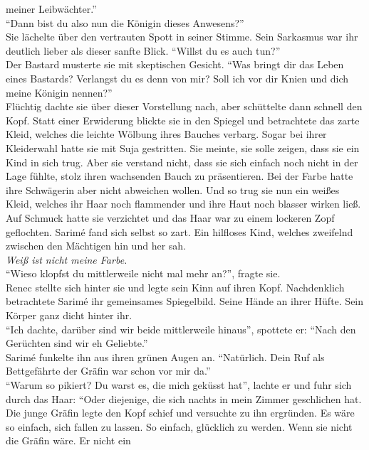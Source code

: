 meiner Leibwächter.''\\
``Dann bist du also nun die Königin dieses Anwesens?''\\
Sie lächelte über den vertrauten Spott in seiner Stimme. Sein Sarkasmus war ihr deutlich lieber als 
dieser sanfte Blick. ``Willst du es auch tun?''\\
Der Bastard musterte sie mit skeptischen Gesicht. ``Was bringt dir das Leben eines Bastards? 
Verlangst du es denn von mir? Soll ich vor dir Knien und dich meine Königin nennen?''\\
Flüchtig dachte sie über dieser Vorstellung nach, aber schüttelte dann schnell den Kopf.
Statt einer Erwiderung blickte sie in den Spiegel und betrachtete das zarte Kleid, welches die 
leichte Wölbung ihres Bauches verbarg. Sogar bei ihrer Kleiderwahl hatte sie mit Suja gestritten. 
Sie meinte, sie solle zeigen, dass sie ein Kind in sich trug. Aber sie verstand nicht, dass sie 
sich einfach noch nicht in der Lage fühlte, stolz ihren wachsenden Bauch zu präsentieren. Bei der 
Farbe hatte ihre Schwägerin aber nicht abweichen wollen. Und so trug sie nun ein weißes Kleid, 
welches ihr Haar noch flammender und ihre Haut noch blasser wirken ließ. Auf Schmuck hatte sie 
verzichtet und das Haar war zu einem lockeren Zopf geflochten. Sarimé fand sich selbst so zart. Ein 
hilfloses Kind, welches zweifelnd zwischen den Mächtigen hin und her sah.\\
\textit{Weiß ist nicht meine Farbe.}\\
``Wieso klopfst du mittlerweile nicht mal mehr an?'', fragte sie.\\
Renec stellte sich hinter sie und legte sein Kinn auf ihren Kopf. Nachdenklich betrachtete 
Sarimé ihr gemeinsames Spiegelbild. Seine Hände an ihrer Hüfte. Sein Körper ganz dicht hinter 
ihr.\\
``Ich dachte, darüber sind wir beide mittlerweile hinaus'', spottete er: ``Nach den Gerüchten sind 
wir eh Geliebte.''\\
Sarimé funkelte ihn aus ihren grünen Augen an. ``Natürlich. Dein Ruf als Bettgefährte der Gräfin 
war schon vor mir da.''\\
``Warum so pikiert? Du warst es, die mich geküsst hat'', lachte er und fuhr sich durch das Haar: 
``Oder diejenige, die sich nachts in mein Zimmer geschlichen hat.\\
Die junge Gräfin legte den Kopf schief und versuchte zu ihn ergründen. Es wäre so einfach, sich 
fallen zu lassen. So einfach, glücklich zu werden. Wenn sie nicht die Gräfin wäre. Er nicht ein 
